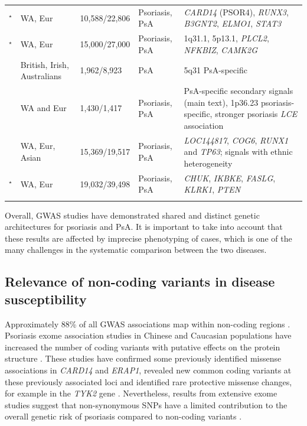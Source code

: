 \begin{landscape}
\begin{center}
\begin{longtable}[ht]{p{.25\textheight} p{.25\textheight} p{.20\textheight} p{.20\textheight} p{.50\textheight}}
\parencite{Tsoi2012}$^\star$ & WA, Eur & 10,588/22,806 & Psoriasis, PsA & \textit{CARD14} (PSOR4), \textit{RUNX3}, \textit{B3GNT2}, \textit{ELMO1}, \textit{STAT3} \\

\parencite{Tsoi2015}$^\star$	& WA, Eur	& 15,000/27,000	& Psoriasis, PsA	& 1q31.1, 5p13.1, \textit{PLCL2}, \textit{NFKBIZ}, \textit{CAMK2G} \\

\parencite{Bowes2015} &	British, Irish, Australians	& 1,962/8,923	& PsA	& 5q31 PsA-specific \\

\parencite{Stuart2015} &	WA and Eur	& 1,430/1,417	& Psoriasis, PsA	& PsA-specific secondary signals (main text), 1p36.23 psoriasis-specific, stronger psoriasis \textit{LCE} association\\

\parencite{Yin2015} &	WA, Eur, Asian	&  15,369/19,517 & Psoriasis, PsA	& \textit{LOC144817}, \textit{COG6}, \textit{RUNX1} and \textit{TP63}; signals with ethnic heterogeneity \\

\parencite{Tsoi2017}$^\star$ &	WA, Eur	& 19,032/39,498	& Psoriasis, PsA	& \textit{CHUK}, \textit{IKBKE}, \textit{FASLG}, \textit{KLRK1}, \textit{PTEN} \\																		
\bottomrule
\medskip
\end{longtable}
\end{center}
\end{landscape}


Overall, GWAS studies have demonstrated shared and distinct genetic architectures for psoriasis and PsA. It is important to take into account that these results are affected by imprecise phenotyping of cases, which is one of the many challenges in the systematic comparison between the two diseases.


\subsection{Relevance of non-coding variants in disease susceptibility}

Approximately 88\% of all GWAS associations map within non-coding regions \parencite{Welter2013}. Psoriasis exome association studies in Chinese and Caucasian populations have increased the number of coding variants with putative effects on the protein structure \parencite{Tang2014, Zuo2015, Dand2017}. These studies have confirmed some previously identified missense associations in \textit{CARD14} and \textit{ERAP1}, revealed new common coding variants at these previously associated loci and identified rare protective missense changes, for example in the \textit{TYK2} gene \parencite{Tang2014,Dand2017}. Nevertheless, results from extensive exome studies suggest that non-synonymous SNPs have a limited contribution to the overall genetic risk of psoriasis compared to non-coding variants \parencite{Tang2014}.

